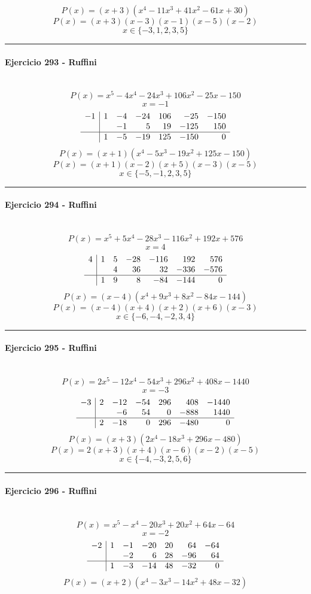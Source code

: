 \documentclass[10pt,a4paper]{article}
\newcommand{\res}[1]{\paragraph{#1}\mbox{}\\[-1.2em]}
\begin{document}
\[ P(x)=(x+3)(x^{4} - 11 x^{3} + 41 x^{2} - 61 x + 30) \]
\[ P(x)=(x+3)(x-3)(x-1)(x-5)(x-2) \]
\[ \boxed{x\in\{-3,1,2,3,5\}} \]
\vspace{1mm}\hrule\vspace{2mm}
\res{Ejercicio 293 - Ruffini}
\[ P(x)=x^{5} - 4 x^{4} - 24 x^{3} + 106 x^{2} - 25 x - 150 \]
\[ x=-1 \]
\[\begin{array}{r|rrrrrr}-1 & 1 & -4 & -24 & 106 & -25 & -150\\  &  & -1 & 5 & 19 & -125 & 150\\\hline  & 1 & -5 & -19 & 125 & -150 & 0\end{array}\]
\[ P(x)=(x+1)(x^{4} - 5 x^{3} - 19 x^{2} + 125 x - 150) \]
\[ P(x)=(x+1)(x-2)(x+5)(x-3)(x-5) \]
\[ \boxed{x\in\{-5,-1,2,3,5\}} \]
\vspace{1mm}\hrule\vspace{2mm}
\res{Ejercicio 294 - Ruffini}
\[ P(x)=x^{5} + 5 x^{4} - 28 x^{3} - 116 x^{2} + 192 x + 576 \]
\[ x=4 \]
\[\begin{array}{r|rrrrrr}4 & 1 & 5 & -28 & -116 & 192 & 576\\  &  & 4 & 36 & 32 & -336 & -576\\\hline  & 1 & 9 & 8 & -84 & -144 & 0\end{array}\]
\[ P(x)=(x-4)(x^{4} + 9 x^{3} + 8 x^{2} - 84 x - 144) \]
\[ P(x)=(x-4)(x+4)(x+2)(x+6)(x-3) \]
\[ \boxed{x\in\{-6,-4,-2,3,4\}} \]
\vspace{1mm}\hrule\vspace{2mm}
\res{Ejercicio 295 - Ruffini}
\[ P(x)=2 x^{5} - 12 x^{4} - 54 x^{3} + 296 x^{2} + 408 x - 1440 \]
\[ x=-3 \]
\[\begin{array}{r|rrrrrr}-3 & 2 & -12 & -54 & 296 & 408 & -1440\\  &  & -6 & 54 & 0 & -888 & 1440\\\hline  & 2 & -18 & 0 & 296 & -480 & 0\end{array}\]
\[ P(x)=(x+3)(2 x^{4} - 18 x^{3} + 296 x - 480) \]
\[ P(x)=2(x+3)(x+4)(x-6)(x-2)(x-5) \]
\[ \boxed{x\in\{-4,-3,2,5,6\}} \]
\vspace{1mm}\hrule\vspace{2mm}
\res{Ejercicio 296 - Ruffini}
\[ P(x)=x^{5} - x^{4} - 20 x^{3} + 20 x^{2} + 64 x - 64 \]
\[ x=-2 \]
\[\begin{array}{r|rrrrrr}-2 & 1 & -1 & -20 & 20 & 64 & -64\\  &  & -2 & 6 & 28 & -96 & 64\\\hline  & 1 & -3 & -14 & 48 & -32 & 0\end{array}\]
\[ P(x)=(x+2)(x^{4} - 3 x^{3} - 14 x^{2} + 48 x - 32) \]
\end{document}
